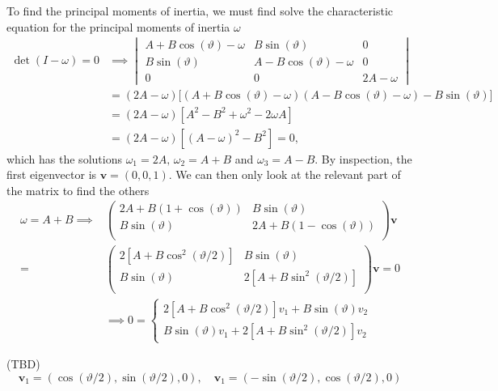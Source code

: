 \documentclass{article}
\begin{document}
\begin{enumerate}[label=(\alph*)]
        To find the principal moments of inertia, we must find solve the characteristic equation for the principal moments of inertia $\omega$
        \begin{align*}
             \det(I - \omega) = 0& \implies
            \begin{vmatrix*}
                A + B\cos(\vartheta) - \omega & B \sin(\vartheta) & 0 \\
                B \sin(\vartheta) & A - B\cos(\vartheta) - \omega & 0 \\
                0 & 0 & 2A - \omega
            \end{vmatrix*} \\
            &= (2A - \omega) \big[(A + B\cos(\vartheta) - \omega) (A - B\cos(\vartheta) - \omega)  - B \sin(\vartheta) \big]  \\
            &= (2A - \omega)[A^2 - B^2 + \omega^2 - 2\omega A] \\
            &= (2A - \omega)[(A - \omega)^2 - B^2] = 0,
        \end{align*}
        which has the solutions $\omega_1 = 2A, \, \omega_2 = A+B$ and $\omega_3 = A-B$. By inspection, the first eigenvector is $\mathbf{v} = (0, 0, 1)$. We can then only look at the relevant part of the matrix to find the others
        \begin{align*}
            \omega = A + B \implies& 
            \begin{pmatrix*}
                2A + B(1 + \cos(\vartheta)) & B \sin(\vartheta)  \\
                B \sin(\vartheta) & 2A + B(1-\cos(\vartheta))  \\
            \end{pmatrix*} 
            \mathbf{v}\\
            =& 
            \begin{pmatrix*}
                2[A + B \cos^2(\vartheta / 2)] & B \sin(\vartheta)  \\
                B \sin(\vartheta) & 2[A + B\sin^2(\vartheta/2)]  \\
            \end{pmatrix*} 
            \mathbf{v} = 0 \\
            &\implies 0 = 
            \begin{cases}
                2[A + B \cos^2(\vartheta / 2)] v_1 + B \sin(\vartheta) v_2 \\
                B \sin(\vartheta) v_1   + 2[A + B\sin^2(\vartheta/2)] v_2
            \end{cases}
        \end{align*}

    (TBD)
    \begin{equation*}
        \mathbf{v}_1 = (\cos(\vartheta/2), \sin(\vartheta/2), 0), \quad \mathbf{v}_1 = (-\sin(\vartheta/2), \cos(\vartheta/2), 0)
    \end{equation*}

    \end{enumerate}
\end{document}
